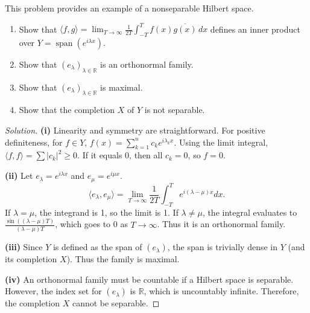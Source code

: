 \documentclass{article}
\begin{document}
	\begin{problem}
		This problem provides an example of a nonseparable Hilbert space.
		\begin{enumerate}
			\item[(i)] Show that $\langle f, g \rangle = \lim_{T \rightarrow \infty} \frac{1}{2T} \int_{-T}^{T} f(x)\overline{g(x)} \, dx$ defines an inner product over $Y = \operatorname{span}(e^{i\lambda x})$.
			\item[(ii)] Show that $(e_{\lambda})_{\lambda \in \mathbb{R}}$ is an orthonormal family.
			\item[(iii)] Show that $(e_{\lambda})_{\lambda \in \mathbb{R}}$ is maximal.
			\item[(iv)] Show that the completion $X$ of $Y$ is not separable.
		\end{enumerate}
	\end{problem}
    \begin{proof}[Solution]
        \textbf{(i)} Linearity and symmetry are straightforward. For positive definiteness, for $f \in Y$, $f(x) = \sum_{k=1}^n c_k e^{i\lambda_k x}$. Using the limit integral, $\langle f, f \rangle = \sum |c_k|^2 \ge 0$. If it equals 0, then all $c_k = 0$, so $f = 0$.
        
        \textbf{(ii)} Let $e_\lambda = e^{i\lambda x}$ and $e_\mu = e^{i\mu x}$.
        \[ \langle e_\lambda, e_\mu \rangle = \lim_{T \to \infty} \frac{1}{2T} \int_{-T}^T e^{i(\lambda - \mu)x} dx. \]
        If $\lambda = \mu$, the integrand is 1, so the limit is 1. If $\lambda \neq \mu$, the integral evaluates to $\frac{\sin((\lambda-\mu)T)}{(\lambda-\mu)T}$, which goes to 0 as $T \to \infty$. Thus it is an orthonormal family.
        
        \textbf{(iii)} Since $Y$ is defined as the span of $(e_\lambda)$, the span is trivially dense in $Y$ (and its completion $X$). Thus the family is maximal.
        
        \textbf{(iv)} An orthonormal family must be countable if a Hilbert space is separable. However, the index set for $(e_\lambda)$ is $\mathbb{R}$, which is uncountably infinite. Therefore, the completion $X$ cannot be separable.
    \end{proof}
\end{document}
